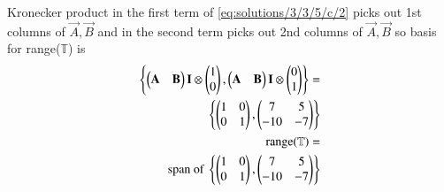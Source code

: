 Kronecker product in the first term of \eqref{eq:solutions/3/3/5/c/2} picks out 1st columns of $\vec{A},\vec{B}$ and in the second term picks out 2nd columns of $\vec{A},\vec{B}$ so basis for range($\mathbb{T}$) is
\begin{align}
    \left\{\begin{pmatrix}\mathbf{A}&\mathbf{B}\end{pmatrix}  \mathbf{I}\otimes \begin{pmatrix}1\\0\end{pmatrix},\begin{pmatrix}\mathbf{A}&\mathbf{B}\end{pmatrix}  \mathbf{I}\otimes \begin{pmatrix}0\\1\end{pmatrix}\right\}=\\\left\{\begin{pmatrix}1&0\\0&1\end{pmatrix},\begin{pmatrix}7&5\\-10&-7\end{pmatrix}\right\}\\
    \text{range}(\mathbb{T})
    =\\\text{span of }\left\{\begin{pmatrix}1&0\\0&1\end{pmatrix},\begin{pmatrix}7&5\\-10&-7\end{pmatrix}\right\}
\end{align}

